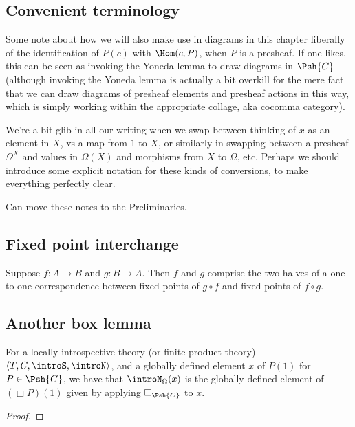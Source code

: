 \subsection{Convenient terminology}
\begin{TODOblock}
Some note about how we will also make use in diagrams in this chapter liberally of the identification of $P(c)$ with $\Hom(c, P)$, when $P$ is a presheaf. If one likes, this can be seen as invoking the Yoneda lemma to draw diagrams in $\Psh{C}$ (although invoking the Yoneda lemma is actually a bit overkill for the mere fact that we can draw diagrams of presheaf elements and presheaf actions in this way, which is simply working within the appropriate collage, aka cocomma category).

We're a bit glib in all our writing when we swap between thinking of $x$ as an element in $X$, vs a map from $1$ to $X$, or similarly in swapping between a presheaf $\Omega^X$ and values in $\Omega(X)$ and morphisms from $X$ to $\Omega$, etc. Perhaps we should introduce some explicit notation for these kinds of conversions, to make everything perfectly clear.

Can move these notes to the Preliminaries.
\end{TODOblock}

\subsection{Fixed point interchange}
\begin{theorem}
Suppose $f : A \to B$ and $g : B \to A$. Then $f$ and $g$ comprise the two halves of a one-to-one correspondence between fixed points of $g \circ f$ and fixed points of $f \circ g$.
\end{theorem}

\subsection{Another box lemma}
\begin{theorem}\label{BoxMatchesN}
For a locally introspective theory (or finite product theory) $\langle T, C, \introS, \introN \rangle$, and a globally defined element $x$ of $P(1)$ for $P \in \Psh{C}$, we have that $\introN_{\Omega}(x)$ is the globally defined element of $(\Box P)(1)$ given by applying $\Box_{\Psh{C}}$ to $x$.
\end{theorem}
\begin{proof}
\TODO
\end{proof}

